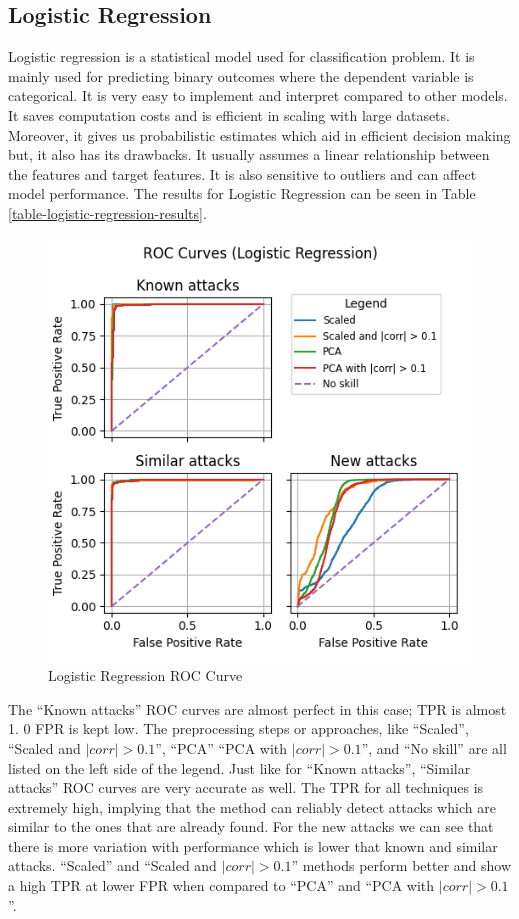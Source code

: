 \documentclass[journal]{IEEEtran}
\begin{document}
\subsection{Logistic Regression}
Logistic regression is a statistical model used for classification problem. It is mainly used for predicting binary outcomes where the dependent variable is categorical. It is very easy to implement and interpret compared to other models. It saves computation costs and is efficient in scaling with large datasets. Moreover, it gives us probabilistic estimates which aid in efficient decision making but, it also has its drawbacks. It usually assumes a linear relationship between the features and target features. It is also sensitive to outliers and can affect model performance.
The results for Logistic Regression can be seen in Table \ref{table-logistic-regression-results}.
\begin{figure}
    \centering
    \includegraphics[width=\linewidth]{figures/Logistic Regression_roc_all_small.png}
    \caption{Logistic Regression ROC Curve}
    \label{fig:logreg_roc}
\end{figure}


The ``Known attacks'' ROC curves are almost perfect in this case; TPR is almost 1. 0 FPR is kept low. The preprocessing steps or approaches, like ``Scaled'', ``Scaled and $|corr| > 0. 1$'', ``PCA'' ``PCA with $|corr| > 0.1$'', and ``No skill'' are all listed on the left side of the legend. Just like for ``Known attacks'', ``Similar attacks'' ROC curves are very accurate as well. The TPR for all techniques is extremely high, implying that the method can reliably detect attacks which are similar to the ones that are already found. For the new attacks we can see that there is more variation with performance which is lower that known and similar attacks. ``Scaled'' and ``Scaled and $|corr| > 0.1$'' methods perform better and show a high TPR at lower FPR when compared to ``PCA'' and ``PCA with $|corr| > 0.1$''.
\end{document}
